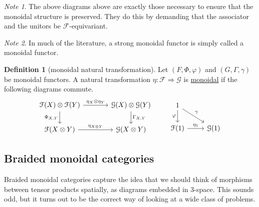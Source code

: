 \documentclass[a4paper,10pt]{scrreprt}
\newcommand{\defn}[1]{\ul{#1}}
\theoremstyle{definition}
\newtheorem{definition}{Definition}[section]
\theoremstyle{plain}
\newtheorem{lemma}{Lemma}[section]
\theoremstyle{remark}
\newtheorem{note}{Note}[section]
\begin{document}
\begin{note}
  The above diagrams above are exactly those necessary to ensure that the monoidal structure is preserved. They do this by demanding that the associator and the unitors be $\mathcal{F}$-equivariant.
\end{note} 

\begin{note}
  In much of the literature, a strong monoidal functor is simply called a monoidal functor.
\end{note}

%

\begin{definition}[monoidal natural transformation]
  \label{def:monoidalnaturatransformation}
  Let $(F, \Phi, \varphi)$ and $(G, \Gamma, \gamma)$ be monoidal functors. A natural transformation $\eta: \mathcal{F} \Rightarrow \mathcal{G}$ is \defn{monoidal} if the following diagrams commute.
  \begin{equation*}
    \begin{tikzcd}[column sep=large]
      \mathcal{F}(X) \otimes \mathcal{F}(Y) 
      \arrow[r, "\eta_{X} \otimes \eta_{Y}"]
      \arrow[d, swap, "{\Phi_{X, Y}}"]
      & \mathcal{G}(X) \otimes \mathcal{G}(Y)
      \arrow[d, "{\Gamma_{X, Y}}"]
      \\
      \mathcal{F}(X \otimes Y)
      \arrow[r, "\eta_{X \otimes Y}"]
      & \mathcal{G}(X \otimes Y)
    \end{tikzcd}
    \qquad
    \begin{tikzcd}
      1
      \arrow[d, swap, "\varphi"]
      \arrow[dr, "\gamma"]
      \\
      \mathcal{F}(1)
      \arrow[r, "\eta_{1}"]
      & \mathcal{G}(1)
    \end{tikzcd}
  \end{equation*}
\end{definition}

\subsection{Braided monoidal categories}
Braided monoidal categories capture the idea that we should think of morphisms between tensor products spatially, as diagrams embedded in 3-space. This sounds odd, but it turns out to be the correct way of looking at a wide class of problems. 
\end{document}
